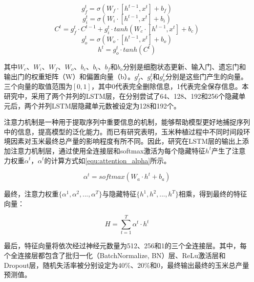 \begin{equation}
  \label{equ:lstm1}
  g_f^t=\sigma (W_f\cdot [h^{t-1}, x^t]+b_f)
\end{equation}
\begin{equation}
  \label{equ:lstm2}
  g_i^t=\sigma (W_i\cdot [h^{t-1}, x^t]+b_i)
\end{equation}
\begin{equation}
  \label{equ:lstm3}
  C^t=g_f^t\cdot C^{t-1}+g_i^t\cdot tanh(W_c\cdot [h^{t-1}, x^t]+b_c)
\end{equation}
\begin{equation}
  \label{equ:lstm4}
  g_o^t=\sigma (W_o\cdot [h^{t-1}, x^t]+b_o)
\end{equation}
\begin{equation}
  \label{equ:lstm5}
  h^t=g_o^t\cdot tanh(C^t)
\end{equation}

\par 其中$W_c$、$W_i$、$W_f$、$W_o$、$b_c$、$b_i$、$b_f$和$b_o$分别是细胞状态更新、输入门、遗忘门和输出门的权重矩阵（W）和偏置向量（b）。$g_f^t$、$g_i^t$和$g_o^t$分别是这些门产生的向量。三个向量的取值范围为$[0,1]$，其中0代表完全删除信息，1代表完全保存信息。本研究中，采用了两个并列的LSTM层，在分别尝试了64、128、192和256个隐藏单元后，两个并列LSTM层隐藏单元数被设定为128和192个。

\par 注意力机制是一种用于提取序列中重要信息的机制，能够帮助模型更好地捕捉序列中的信息，提高模型的泛化能力。而已有研究表明，玉米种植过程中不同时间段环境因素对玉米最终总产量的影响程度有所不同\cite{shook2021crop}。因此，研究在LSTM层的输出上添加注意力机制层，通过使用全连接层和softmax激活为每个隐藏特征$h^t$产生了注意力权重$\alpha ^t$，$\alpha ^t$的计算方式如\autoref{equ:attention_alpha}所示。

\begin{equation}
  \label{equ:attention_alpha}
  \alpha ^t=softmax (W_a\cdot h^t+b_a)
\end{equation}

\par 最终，注意力权重$\{\alpha ^1,\alpha ^2,..., \alpha ^T \}$与隐藏特征$\{h ^1,h ^2,..., h ^T \}$相乘，得到最终的特征向量：

\begin{equation}
  \label{equ:attention}
  H=\sum_{t=1}^T \alpha ^t\cdot h^t
\end{equation}

\par 最后，特征向量将依次经过神经元数量为512、256和1的三个全连接层。其中，每个全连接层都包含了批归一化（BatchNormalize, BN）层、ReLu激活层和Dropout层，随机失活率被分别设定为40\%、20\%和0，最终输出最终的玉米总产量预测值。

